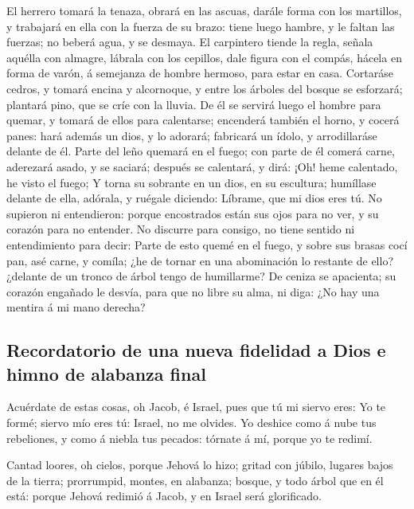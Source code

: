 El herrero tomará la tenaza, obrará en las ascuas,
darále forma con los martillos, y trabajará en ella con la fuerza de su
brazo: tiene luego hambre, y le faltan las fuerzas; no beberá agua, y se
desmaya.  El carpintero tiende la regla, señala aquélla
con almagre, lábrala con los cepillos, dale figura con el compás, hácela
en forma de varón, á semejanza de hombre hermoso, para estar en casa.
 Cortaráse cedros, y tomará encina y alcornoque, y entre
los árboles del bosque se esforzará; plantará pino, que se críe con la
lluvia.  De él se servirá luego el hombre para quemar, y
tomará de ellos para calentarse; encenderá también el horno, y cocerá
panes: hará además un dios, y lo adorará; fabricará un ídolo, y
arrodillaráse delante de él.  Parte del leño quemará en
el fuego; con parte de él comerá carne, aderezará asado, y se saciará;
después se calentará, y dirá: ¡Oh! heme calentado, he visto el fuego;
 Y torna su sobrante en un dios, en su escultura;
humíllase delante de ella, adórala, y ruégale diciendo: Líbrame, que mi
dios eres tú.  No supieron ni entendieron: porque
encostrados están sus ojos para no ver, y su corazón para no entender.
 No discurre para consigo, no tiene sentido ni
entendimiento para decir: Parte de esto quemé en el fuego, y sobre sus
brasas cocí pan, asé carne, y comíla; ¿he de tornar en una abominación
lo restante de ello? ¿delante de un tronco de árbol tengo de humillarme?
 De ceniza se apacienta; su corazón engañado le desvía,
para que no libre su alma, ni diga: ¿No hay una mentira á mi mano
derecha?

\hypertarget{recordatorio-de-una-nueva-fidelidad-a-dios-e-himno-de-alabanza-final}{%
\subsection{Recordatorio de una nueva fidelidad a Dios e himno de
alabanza
final}\label{recordatorio-de-una-nueva-fidelidad-a-dios-e-himno-de-alabanza-final}}

 Acuérdate de estas cosas, oh Jacob, é Israel, pues que
tú mi siervo eres: Yo te formé; siervo mío eres tú: Israel, no me
olvides.  Yo deshice como á nube tus rebeliones, y como á
niebla tus pecados: tórnate á mí, porque yo te redimí.

 Cantad loores, oh cielos, porque Jehová lo hizo; gritad
con júbilo, lugares bajos de la tierra; prorrumpid, montes, en alabanza;
bosque, y todo árbol que en él está: porque Jehová redimió á Jacob, y en
Israel será glorificado.

